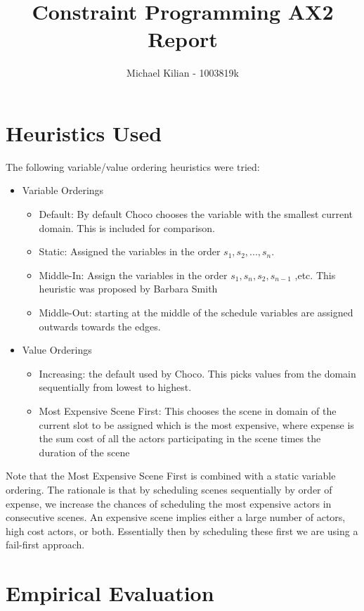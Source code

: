 \documentclass{article}
\begin{document}
\title{Constraint Programming AX2 Report}
\author{Michael Kilian - 1003819k}
\maketitle
\section{Heuristics Used}
The following variable/value ordering heuristics were tried:
\begin{itemize}
\item{Variable Orderings}
    \begin{itemize}
        \item{Default: By default Choco chooses the variable with the smallest current domain. This is included for comparison.}
        \item{Static: Assigned the variables in the order $s_{1},s_{2},...,s_{n}$.}
        \item{Middle-In: Assign the variables in the order $s_{1},s_{n},s_{2},s_{n-1}$ ,etc. This heuristic was proposed by Barbara Smith \cite{Smith2003,Smith2005}}
        \item{Middle-Out: starting at the middle of the schedule variables are assigned outwards towards the edges.}
    \end{itemize}
\item{Value Orderings}
    \begin{itemize}
        \item{Increasing: the default used by Choco. This picks values from the domain sequentially from lowest to highest.}
        \item{Most Expensive Scene First: This chooses the scene in domain of the current slot to be assigned which is the most expensive, where expense is the sum cost of all the actors participating in the scene times the duration of the scene}
    \end{itemize}
\end{itemize}

Note that the Most Expensive Scene First is combined with a static variable ordering. The rationale is that by scheduling scenes sequentially by order of expense, we increase the chances of scheduling the most expensive actors in consecutive scenes. An expensive scene implies either a large number of actors, high cost actors, or both. Essentially then by scheduling these first we are using a fail-first approach.

\section{Empirical Evaluation}
\end{document}
